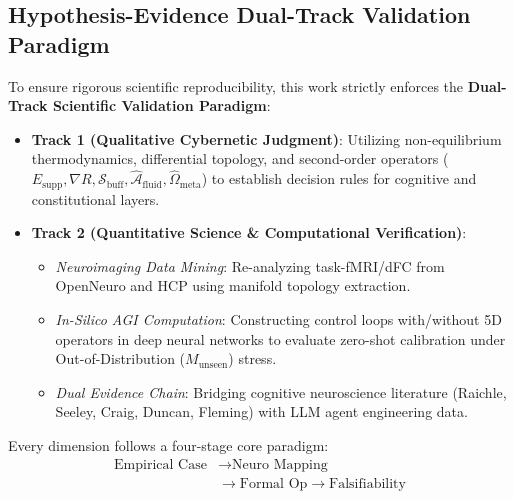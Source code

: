 \documentclass[journal,twocolumn,10pt]{IEEEtran}
\begin{document}
\subsection{Hypothesis-Evidence Dual-Track Validation Paradigm}
To ensure rigorous scientific reproducibility, this work strictly enforces the \textbf{Dual-Track Scientific Validation Paradigm}:
\begin{itemize}
    \item \textbf{Track 1 (Qualitative Cybernetic Judgment)}: Utilizing non-equilibrium thermodynamics, differential topology, and second-order operators ($E_{\text{supp}}, \nabla R, \mathcal{S}_{\text{buff}}, \hat{\mathcal{A}}_{\text{fluid}}, \hat{\Omega}_{\text{meta}}$) to establish decision rules for cognitive and constitutional layers.
    \item \textbf{Track 2 (Quantitative Science \& Computational Verification)}:
    \begin{itemize}
        \item \emph{Neuroimaging Data Mining}: Re-analyzing task-fMRI/dFC from OpenNeuro and HCP using manifold topology extraction.
        \item \emph{In-Silico AGI Computation}: Constructing control loops with/without 5D operators in deep neural networks to evaluate zero-shot calibration under Out-of-Distribution ($M_{\text{unseen}}$) stress.
        \item \emph{Dual Evidence Chain}: Bridging cognitive neuroscience literature (Raichle, Seeley, Craig, Duncan, Fleming) with LLM agent engineering data.
    \end{itemize}
\end{itemize}

Every dimension follows a four-stage core paradigm:
\begin{equation}
\begin{aligned}
\text{Empirical Case} &\longrightarrow \text{Neuro Mapping} \\
&\longrightarrow \text{Formal Op} \longrightarrow \text{Falsifiability}
\end{aligned}
\end{equation}
\end{document}
